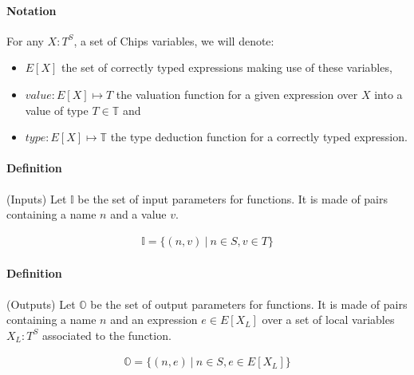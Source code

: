\documentclass{article}
\begin{document}
\paragraph{Notation} For any $X : T^S$, a set of Chips variables, we will denote:
\begin{itemize}
    \item $E[X]$ the set of correctly typed expressions making use of these variables,
    \item $value : E[X] \mapsto T$ the valuation function for a given expression over $X$ into a value of type $T\in\mathbb{T}$ and
    \item $type : E[X] \mapsto \mathbb{T}$ the type deduction function for a correctly typed expression.
\end{itemize}


\paragraph{Definition} (Inputs) Let $\mathbb{I}$ be the set of input parameters for functions. It is made of pairs containing a name $n$ and a value $v$.

\begin{align}
    \mathbb{I} = \{(n,v)~|~n \in S, v \in T\}
\end{align}

\paragraph{Definition} (Outputs) Let $\mathbb{O}$ be the set of output parameters for functions. It is made of pairs containing a name $n$ and an expression $e \in E[X_L]$ over a set of local variables $X_L : T^S$ associated to the function.

\begin{align}
    \mathbb{O} = \{(n,e)~|~n \in S, e \in E[X_L]\}
\end{align}
\end{document}
